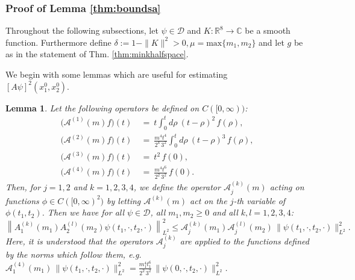 \documentclass[b5paper,draft,openbib,12pt]{memoir}
\newtheorem{Lemma}[Def]{Lemma}
\newcommand{\R}{\mathbb{R}}
\newcommand{\CC}{\mathbb{C}}
\begin{document}
\subsubsection{Proof of Lemma \ref{thm:boundsa}} \label{sec:proofboundsa}

Throughout the following subsections, let $\psi \in \mathscr{D}$ and 
$K : \R^8 \rightarrow \CC$ be a smooth function. Furthermore define 
\(\delta:= 1-\|K\|^2>0, \mu=\text{max}\{m_1,m_2\}\) and let \(g\) 
be as in the statement of Thm. \ref{thm:minkhalfspace}.

We begin with some lemmas which are useful for estimating \\
$[A\psi]^2(x_1^0,x_2^0)$.

\begin{Lemma} \label{thm:estimatetensoroperators}
	Let the following operators be defined on $C([0,\infty))$:
	\begin{align}
		\big(\mathcal{A}^{(1)}(m) f\big)(t) ~&=~ t \int_0^{t} d \rho ~ (t-\rho)^2\,  f(\rho),\nonumber\\
		\big(\mathcal{A}^{(2)}(m) f \big)(t) ~&=~ \frac{m^4 t^4}{2^4 \,3^2} \int_0^{t} d\rho ~(t-\rho)^3 \, f(\rho),\nonumber\\
		\big(\mathcal{A}^{(3)}(m) f\big)(t) ~&=~ t^2 \, f(0),\nonumber\\
		\big(\mathcal{A}^{(4)}(m) f \big)(t) ~&=~ \frac{m^4 t^6}{2^2\, 3^2} \, f(0).
	\label{eq:defcurlyoperators}
	\end{align}
  Then, for $j=1,2$ and $k=1,2,3,4$, we define the operator 
  $\mathcal{A}_j^{(k)}(m)$ acting on functions 
  $\phi \in C([0,\infty)^2)$ by letting $\mathcal{A}^{(k)}(m)$ act 
  on the $j$-th variable of $\phi(t_1,t_2)$.
Then we have for all $\psi \in \mathscr{D}$, all $m_1,m_2\geq 0$ and 
all $k,l=1,2,3,4$:
\begin{equation}
		\left\| A_1^{(k)}(m_1) A_2^{(l)}(m_2)  \psi(t_1,\cdot,t_2,\cdot) \right\|^2_{L^2} \!\!\leq\! \mathcal{A}_j^{(k)}(m_1) \mathcal{A}_j^{(l)}(m_2)\, \|\psi(t_1,\cdot,t_2,\cdot)\|^2_{L^2}.\label{eq:aestimate}
	\end{equation}
Here, it is understood that the operators $\mathcal{A}_j^{(k)}$ 
are applied to the functions defined by the norms which follow them, 
e.g.\, \\
$\mathcal{A}_1^{(4)}(m_1)\, \|\psi(t_1,\cdot,t_2,\cdot)\|^2_{L^2} = \frac{m^4_1 t_1^6}{2^2\, 3^2} \, \|\psi(0,\cdot,t_2,\cdot)\|^2_{L^2}$.
\end{Lemma}
\end{document}
